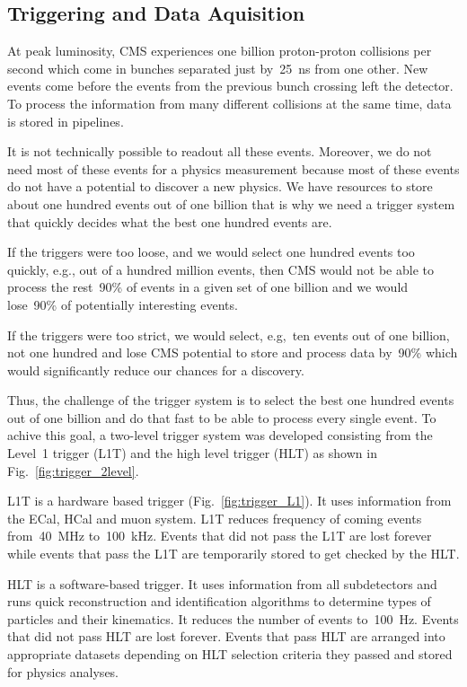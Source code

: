 \subsection{Triggering and Data Aquisition}

At peak luminosity, CMS experiences one billion proton-proton collisions per second which come in bunches separated just by~25~ns from one other. New events come before the events from the previous bunch crossing left the detector. To process the information from many different collisions at the same time, data is stored in pipelines. 

It is not technically possible to readout all these events. Moreover, we do not need most of these events for a physics measurement because most of these events do not have a potential to discover a new physics. We have resources to store about one hundred events out of one billion that is why we need a trigger system that quickly decides what the best one hundred events are.

If the triggers were too loose, and we would select one hundred events too quickly, e.g., out of a hundred million events, then CMS would not be able to process the rest~90\% of events in a given set of one billion and we would lose~90\% of potentially interesting events.

If the triggers were too strict, we would select, e.g,~ten events out of one billion, not one hundred and lose CMS potential to store and process data by~90\% which would significantly reduce our chances for a discovery.

Thus, the challenge of the trigger system is to select the best one hundred events out of one billion and do that fast to be able to process every single event. To achive this goal, a two-level trigger system was developed consisting from the Level~1 trigger (L1T) and the high level trigger (HLT) as shown in Fig.~\ref{fig:trigger_2level}.

L1T is a hardware based trigger (Fig.~\ref{fig:trigger_L1}). It uses information from the ECal, HCal and muon system. L1T reduces frequency of coming events from~40~MHz to~100~kHz. Events that did not pass the L1T are lost forever while events that pass the L1T are temporarily stored to get checked by the HLT.

HLT is a software-based trigger. It uses information from all subdetectors and runs quick reconstruction and identification algorithms to determine types of particles and their kinematics. It reduces the number of events to~100~Hz. Events that did not pass HLT are lost forever. Events that pass HLT are arranged into appropriate datasets depending on HLT selection criteria they passed and stored for physics analyses.


